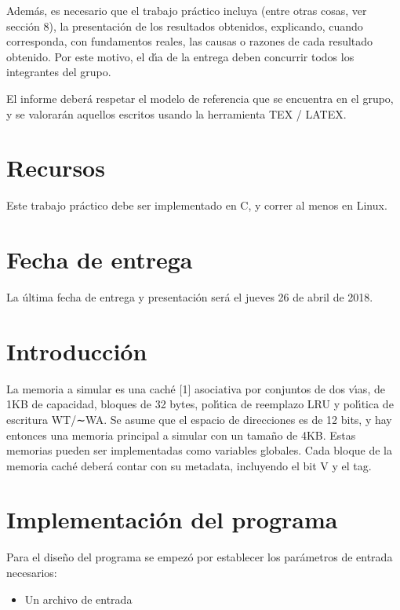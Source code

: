 \documentclass[11pt,a4paper]{article}
\begin{document}
Además, es necesario que el trabajo práctico incluya (entre otras cosas, ver sección 8), la presentación de los resultados obtenidos, explicando, cuando corresponda, con fundamentos reales, las causas o razones de cada resultado obtenido. Por este motivo, el dı́a de la entrega deben concurrir todos los integrantes del grupo.

El informe deber\'a respetar el modelo de referencia que se encuentra en el grupo, y se valorar\'an aquellos escritos usando la herramienta TEX / LATEX.

\section{Recursos}

Este trabajo práctico debe ser implementado en C, y correr al menos en Linux.

\section{Fecha de entrega}

La última fecha de entrega y presentación ser\'a el jueves 26 de abril de 2018.

\section{Introducción}\label{informe}
La memoria a simular es una caché [1] asociativa por conjuntos de dos
vı́as, de 1KB de capacidad, bloques de 32 bytes, polı́tica de reemplazo LRU
y polı́tica de escritura WT/∼WA. Se asume que el espacio de direcciones es
de 12 bits, y hay entonces una memoria principal a simular con un tamaño
de 4KB. Estas memorias pueden ser implementadas como variables globales.
Cada bloque de la memoria caché deberá contar con su metadata, incluyendo
el bit V y el tag.


\section{Implementaci\'on del programa}

Para el dise\~no del programa se empez\'o por establecer los par\'ametros de entrada necesarios:

\begin{itemize}
\item Un archivo de entrada
\end{itemize}
\end{document}
